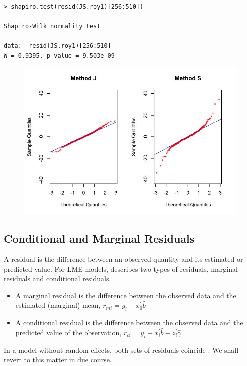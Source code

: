 \documentclass[Main.tex]{subfiles}
\begin{document}
\begin{framed}
	\begin{verbatim}
> shapiro.test(resid(JS.roy1)[256:510])

Shapiro-Wilk normality test

data:  resid(JS.roy1)[256:510]
W = 0.9395, p-value = 9.503e-09
\end{verbatim}
\end{framed}
\begin{figure}[h!]
\centering
\includegraphics[width=0.9\linewidth]{Resid-newplot2}
\caption{}
\label{fig:Resid-newplot2}
\end{figure}

\newpage


\subsection{Conditional and Marginal Residuals}
A residual is the difference between an observed quantity and its estimated or predicted value. For LME models, \citet{schab} describes two types of residuals, marginal residuals and conditional residuals. 

\begin{itemize}
	\item A marginal residual is the difference between the observed data and the estimated (marginal) mean, $r_{mi} = y_i - x_0^{\prime} \hat{b}$
	\item A conditional residual is the difference between the observed data and the predicted value of the observation,
	$r_{ci} = y_i - x_i^{\prime} \hat{b} - z_i^{\prime} \hat{\gamma}$	
\end{itemize} 
In a model without random effects, both sets of
residuals coincide \citep{schab} . We shall revert to this matter in due course.
\end{document}
